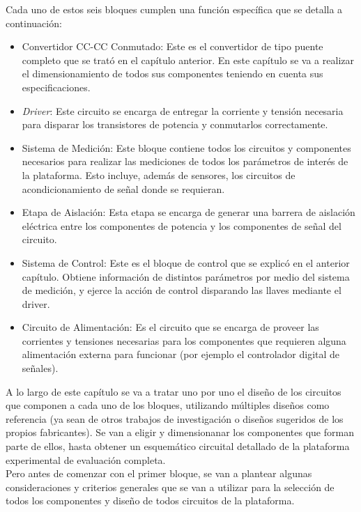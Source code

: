 Cada uno de estos seis bloques cumplen una función específica que se detalla a continuación:\\

\begin{itemize}
    \item {\SemiBold Convertidor CC-CC Conmutado:} Este es el convertidor de tipo puente completo que se trató en el capítulo anterior. En este capítulo se va a realizar el dimensionamiento de todos sus componentes teniendo en cuenta sus especificaciones. 
    \item {\SemiBold\textit{Driver}:} Este circuito se encarga de entregar la corriente y tensión necesaria para disparar los transistores de potencia y conmutarlos correctamente.
    \item {\SemiBold Sistema de Medición:} Este bloque contiene todos los circuitos y componentes necesarios para realizar las mediciones de todos los parámetros de interés de la plataforma. Esto incluye, además de sensores, los circuitos de acondicionamiento de señal donde se requieran.
    \item {\SemiBold Etapa de Aislación:} Esta etapa se encarga de generar una barrera de aislación eléctrica entre los componentes de potencia y los componentes de señal del circuito.
    \item {\SemiBold Sistema de Control:} Este es el bloque de control que se explicó en el anterior capítulo. Obtiene información de distintos parámetros por medio del sistema de medición, y ejerce la acción de control disparando las llaves mediante el driver.
    \item {\SemiBold Circuito de Alimentación:} Es el circuito que se encarga de proveer las corrientes y tensiones necesarias para los componentes que requieren alguna alimentación externa para funcionar (por ejemplo el controlador digital de señales).\\
\end{itemize}

A lo largo de este capítulo se va a tratar uno por uno el diseño de los circuitos que componen a cada uno de los bloques, utilizando múltiples diseños como referencia (ya sean de otros trabajos de investigación o diseños sugeridos de los propios fabricantes). Se van a eligir y dimensionanar los componentes que forman parte de ellos, hasta obtener un esquemático circuital detallado de la plataforma experimental de evaluación completa.\\

Pero antes de comenzar con el primer bloque, se van a plantear algunas consideraciones y criterios generales que se van a utilizar para la selección de todos los componentes y diseño de todos circuitos de la plataforma.\\



\newpage

